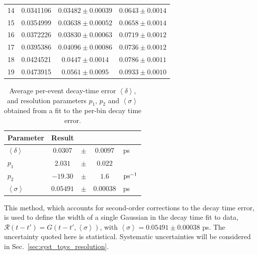\begin{table}[tbp]
\begin{tabular}{llcc}
		    14      &       0.0341106       &       $ 0.03482\pm 0.00039$   &       $ 0.0643\pm 0.0014$     \\
		    15      &       0.0354999       &       $ 0.03638\pm 0.00052$   &       $ 0.0658\pm 0.0014$     \\
		    16      &       0.0372226       &       $ 0.03830\pm 0.00063$   &       $ 0.0719\pm 0.0012$     \\
		    17      &       0.0395386       &       $ 0.04096\pm 0.00086$   &       $ 0.0736\pm 0.0012$     \\
		    18      &       0.0424521       &       $ 0.0447\pm 0.0014$     &       $ 0.0786\pm 0.0011$     \\
		    19      &       0.0473915       &       $ 0.0561\pm 0.0095$     &       $ 0.0933\pm 0.0010$     \\


		\bottomrule
	\end{tabular}
\end{table}

\begin{table}[tbp]
	\centering
	\caption{Average per-event decay-time error $\left<\delta\right>$, and resolution parameters $p_1$, $p_2$ and $\left<\sigma\right>$ obtained from a fit to the per-bin decay time error.
	\label{tab:resPedtecalibFit}
	}
	\begin{tabular}{lcccl}
		\toprule
		Parameter & Result \\
		\midrule
		$\left<\delta\right>$ & $ 0.0307$&$\pm$&$ 0.0097 $& ps\\
		$p_{1}$ & $ 2.031$&$\pm$&$ 0.022$ &\\
		$p_{2}$ & $ -19.30$&$\pm$&$ 1.6$& $\rm ps^{-1}$ \\
		$\left<\sigma\right>$ & $ 0.05491$&$\pm$&$ 0.00038$ & ps \\ 
		\bottomrule
	\end{tabular}
\end{table}

This method, which accounts for second-order corrections to the decay time error, is used to define the width of a single Gaussian in the decay time fit to data, $\mathcal{R}(t-t')=G(t-t',\left<\sigma\right>)$, with $\left<\sigma\right> = 0.05491\pm 0.00038$ ps. The uncertainty quoted here is statistical.  Systematic uncertainties will be considered in Sec.~\ref{sec:syst_toys_resolution}. 

